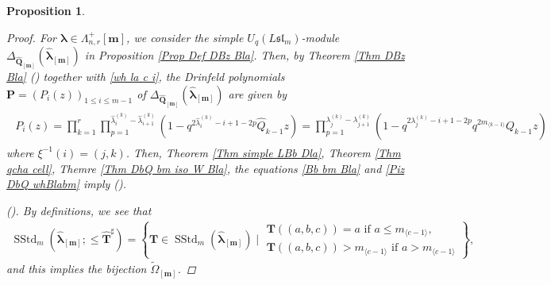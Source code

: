 \documentclass[12pt]{amsart}
\newtheorem{prop}[thm]{Proposition}
\numberwithin{equation}{thm}
\newcommand\bP{\mathbf P}
\newcommand\bQ{\mathbf Q}
\newcommand\bT{\mathbf T}
\renewcommand\bm{\mathbf m} %
\newcommand\la{\lambda}
\newcommand\D{\Delta}
\newcommand\Om{\Omega}
\newcommand\vL{\varLambda}
\newcommand\Bla{\boldsymbol\lambda}
\newcommand\wh{\widehat}
\newcommand\wt{\widetilde}
\newcommand\lan{\langle}
\newcommand\ran{\rangle}
\newcommand\Fsl{\mathfrak{sl}}
\newcommand{\SStd}{\operatorname{SStd}}
\newcounter{ichi}
\newcommand{\roi}{\roman{ichi}}
\newcounter{ni}
\newcommand{\roii}{\roman{ni}}
\newcounter{go}
\newcommand{\rov}{\roman{go}}
\begin{document}
\begin{prop}
\begin{proof}
For $\Bla \in \vL_{n,r}^+[\bm]$, we consider the simple $U_q(L\Fsl_m)$-module $\D_{\wh{\bQ}_{[\bm]}} (\wh{\Bla}_{[\bm]})$ 
in Proposition \ref{Prop Def DBz Bla}. 
Then, by Theorem \ref{Thm DBz Bla} (\rov) together with \eqref{wh la c i}, 
the Drinfeld polynomials $\bP=( P_i(z))_{1 \leq i \leq m-1}$ of $\D_{\wh{\bQ}_{[\bm]}}(\wh{\Bla}_{[\bm]})$ are given by 
\begin{align}
\label{Piz DbQ whBlabm} 
\begin{split}
P_i(z) 
= \prod_{k=1}^r \prod_{p=1}^{\wh{\la}^{(k)}_i - \wh{\la}^{(k)}_{i+1}} (1 - q^{2 \wh{\la}_i^{(k)} - i +1 - 2 p} \wh{Q}_{k-1} z) 
= \prod_{p=1}^{\la_j^{(k)} - \la_{j+1}^{(k)}} (1 - q^{2 \la_j^{(k)}   - i+1 - 2p} q^{2 m_{\lan k-1 \ran}} Q_{k-1} z) 
\end{split}
\end{align}
where $\xi^{-1}(i) =(j,k)$.  
%
Then, Theorem \ref{Thm simple LBb Dla}, Theorem \ref{Thm qcha cell}, Themre \ref{Thm DbQ bm iso W Bla}, 
the equations \eqref{Bb bm Bla} and \eqref{Piz DbQ whBlabm}
 imply (\roi). 

(\roii). 
By definitions, we see that 
\begin{align*}
\SStd_m (\wh{\Bla}_{[\bm]}; \leq \wh{\bT}^{\sharp}) 
= \left\{ \bT \in \SStd_m(\wh{\Bla}_{[\bm]}) \mid 
\begin{array}{l}
\bT((a,b,c)) =  a  \text{ if } a \leq m_{\lan c-1 \ran}, 
\\
\bT ((a,b,c)) > m_{\lan c-1 \ran} \text{ if } a > m_{\lan c-1 \ran} 
\end{array}
\right\}, 
\end{align*} 
and this implies the bijection $\wt{\Om}_{[\bm]}$. 


\end{proof}
\end{prop}
\end{document}
